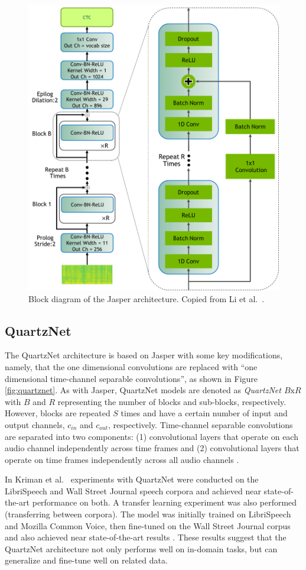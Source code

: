 \documentclass[12pt]{article}
\begin{document}
\begin{figure}
    \centering
    \includegraphics[width=0.5\linewidth]{figures/jasper_vertical.png}
    \caption{Block diagram of the Jasper architecture. Copied from Li et al.~\cite{li_jasper_2019}.}
    \label{fig:jasper}
\end{figure}

\subsection{QuartzNet}\label{sec:quartznet}
The QuartzNet architecture is based on Jasper with some key modifications, namely, that the one dimensional convolutions are replaced with ``one
dimensional time-channel separable convolutions'', as shown in Figure \ref{fig:quartznet}. As with Jasper, QuartzNet models are denoted as
\textit{QuartzNet $B\mbox{x}R$} with $B$ and $R$ representing the number of blocks and sub-blocks, respectively. However, blocks are repeated $S$
times and have a certain number of input and output channels, $c_{in}$ and $c_{out}$, respectively. Time-channel separable convolutions are separated
into two components: (1) convolutional layers that operate on each audio channel independently across time frames and (2) convolutional layers that
operate on time frames independently across all audio channels \cite{kriman_quartznet_2020}.

In Kriman et al.~\cite{kriman_quartznet_2020} experiments with QuartzNet were conducted on the LibriSpeech and Wall Street Journal speech corpora and
achieved near state-of-the-art performance on both. A transfer learning experiment was also performed (transferring between corpora). The model was
initially trained on LibriSpeech and Mozilla Common Voice, then fine-tuned on the Wall Street Journal corpus and also achieved near state-of-the-art
results \cite{kriman_quartznet_2020}. These results suggest that the QuartzNet architecture not only performs well on in-domain tasks, but can
generalize and fine-tune well on related data.
\end{document}
